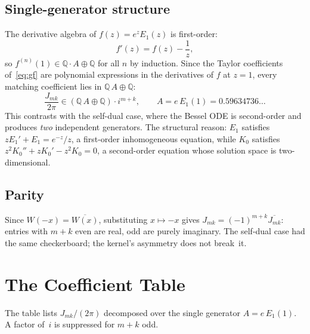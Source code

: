 \documentclass[11pt,a4paper]{article}
\newcommand{\Q}{\mathbb{Q}}
\begin{document}
\subsection*{Single-generator structure}

The derivative algebra of $f(z) = e^z E_1(z)$ is first-order:
\[
  f'(z) = f(z) - \frac{1}{z},
\]
so $f^{(n)}(1) \in \Q\cdot A \oplus \Q$ for all $n$ by induction.
Since the Taylor coefficients of~\eqref{eq:gf} are polynomial
expressions in the derivatives of $f$ at $z = 1$, every matching
coefficient lies in $\Q\,A \oplus \Q$:
\begin{equation}\label{eq:integrality}
  \frac{J_{mk}}{2\pi}
  \in (\Q\,A \oplus \Q) \cdot i^{m+k},
  \qquad A = e\,E_1(1) = 0.59634736\ldots
\end{equation}
This contrasts with the self-dual case, where the Bessel ODE
is second-order and produces \emph{two} independent generators.
The structural reason: $E_1$ satisfies $z E_1' + E_1 = e^{-z}/z$,
a first-order inhomogeneous equation, while $K_0$ satisfies
$z^2 K_0'' + z K_0' - z^2 K_0 = 0$, a second-order equation whose
solution space is two-dimensional.

\subsection*{Parity}

Since $W(-x) = \overline{W(x)}$, substituting $x \mapsto -x$
gives $J_{mk} = (-1)^{m+k}\overline{J_{mk}}$: entries with
$m+k$ even are real, odd are purely imaginary.  The self-dual
case had the same checkerboard; the kernel's asymmetry does
not break~it.

\section{The Coefficient Table}

The table lists $J_{mk}/(2\pi)$ decomposed over the single
generator $A = e\,E_1(1)$.  A factor of~$i$ is suppressed for
$m+k$ odd.
\end{document}
